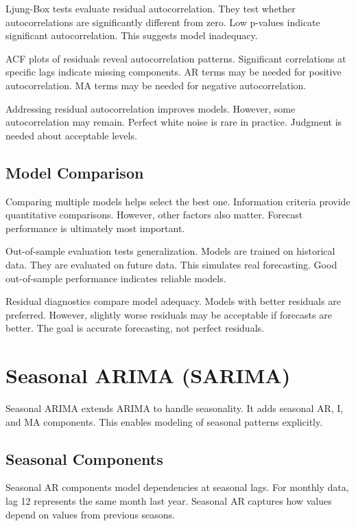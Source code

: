 Ljung-Box tests evaluate residual autocorrelation. They test whether autocorrelations are significantly different from zero. Low p-values indicate significant autocorrelation. This suggests model inadequacy.

ACF plots of residuals reveal autocorrelation patterns. Significant correlations at specific lags indicate missing components. AR terms may be needed for positive autocorrelation. MA terms may be needed for negative autocorrelation.

Addressing residual autocorrelation improves models. However, some autocorrelation may remain. Perfect white noise is rare in practice. Judgment is needed about acceptable levels.

\subsection{Model Comparison}

Comparing multiple models helps select the best one. Information criteria provide quantitative comparisons. However, other factors also matter. Forecast performance is ultimately most important.

Out-of-sample evaluation tests generalization. Models are trained on historical data. They are evaluated on future data. This simulates real forecasting. Good out-of-sample performance indicates reliable models.

Residual diagnostics compare model adequacy. Models with better residuals are preferred. However, slightly worse residuals may be acceptable if forecasts are better. The goal is accurate forecasting, not perfect residuals.

\section{Seasonal ARIMA (SARIMA)}

Seasonal ARIMA extends ARIMA to handle seasonality. It adds seasonal AR, I, and MA components. This enables modeling of seasonal patterns explicitly.

\subsection{Seasonal Components}

Seasonal AR components model dependencies at seasonal lags. For monthly data, lag 12 represents the same month last year. Seasonal AR captures how values depend on values from previous seasons.

